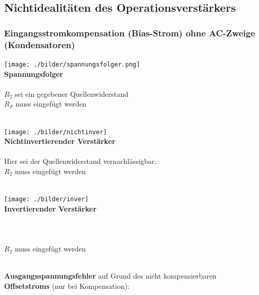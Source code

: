 	\subsection{Nichtidealit\"aten des Operationsverst\"arkers}
        \subsubsection{Eingangsstromkompensation (Bias-Strom) ohne AC-Zweige (Kondensatoren)}
        \begin{minipage}[b]{6cm}
            \texttt{[image: ./bilder/spannungsfolger.png]}\\
            {\bf Spannungsfolger}\\ \\
            $R_2$ sei ein gegebener Quellenwiderstand\\
            $R_F$ muss eingefügt werden\\ \\
        \end{minipage}\hfill
        \begin{minipage}[b]{6cm}
            \texttt{[image: ./bilder/nichtinver]}\\
            {\bf Nichtinvertierender Verstärker}\\ \\
            Hier sei der Quellenwiderstand vernachl\"assigbar.\\ 
            $R_2$ muss eingefügt werden\\ \\
        \end{minipage}\hfill
        \begin{minipage}[b]{6cm}
            \texttt{[image: ./bilder/inver]}\\
            {\bf Invertierender Verstärker}\\ \\ \\ \\
            $R_2$ muss eingefügt werden\\ \\
        \end{minipage}
        \begin{minipage}{9cm}
            \vspace{3mm}
            \textbf{Ausgangsspannungsfehler} auf Grund des nicht kompensierbaren \textbf{Offsetstroms} (nur bei Kompensation):
        \end{minipage}
        \begin{minipage}{9cm}
            \vspace{7mm}
            \hspace{4mm}\\
        \end{minipage}
\newpage

